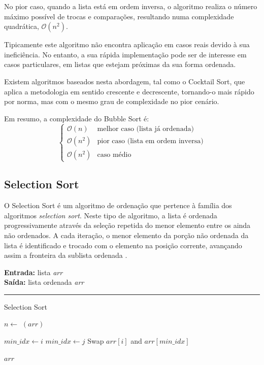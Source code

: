 \documentclass[conference]{IEEEtran}
\begin{document}
No pior caso, quando a lista está em ordem inversa, o algoritmo realiza o número máximo possível de trocas e comparações, resultando numa complexidade quadrática, $\mathcal{O}(n^2)$.


Tipicamente este algoritmo não encontra aplicação em casos reais devido à sua ineficiência. No entanto, a sua rápida implementação pode ser de interesse em casos particulares, em listas que estejam próximas da sua forma ordenada.

Existem algoritmos baseados nesta abordagem, tal como o Cocktail Sort, que aplica a metodologia em sentido crescente e decrescente, tornando-o mais rápido por norma, mas com o mesmo grau de complexidade no pior cenário.

Em resumo, a complexidade do Bubble Sort é:
\[
\begin{cases}
\mathcal{O}(n) & \text{melhor caso (lista já ordenada)} \\
\mathcal{O}(n^2) & \text{pior caso (lista em ordem inversa)} \\
\mathcal{O}(n^2) & \text{caso médio}
\end{cases}
\]

\subsection{Selection Sort}

O Selection Sort é um algoritmo de ordenação que pertence à família dos algoritmos \textit{selection sort}. Neste tipo de algoritmo, a lista é ordenada progressivamente através da seleção repetida do menor elemento entre os ainda não ordenados. A cada iteração, o menor elemento da porção não ordenada da lista é identificado e trocado com o elemento na posição corrente, avançando assim a fronteira da sublista ordenada \cite{purnomo2023theoretical}.

\begin{algorithm}[H]
    \raggedright
    \vspace{.1em}
    \textbf{Entrada:} lista \textit{arr} \\
    \textbf{Saída:} lista ordenada \textit{arr} \\
    \vspace{.5em}
    \hrule 
    \caption{Selection Sort}
    \begin{algorithmic}[1]
        \State $n \gets$ $(arr)$
    
            \State $min\_idx \gets i$
                    \State $min\_idx \gets j$
                \EndIf
            \EndFor
                \State Swap $arr[i]$ and $arr[min\_idx]$
            \EndIf
        \EndFor
    
        \State \Return $arr$
    \end{algorithmic}
\end{algorithm}
\end{document}
